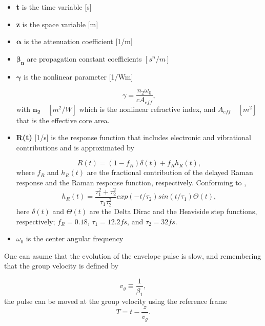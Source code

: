     \begin{itemize}
        \item \textbf{t} is the time variable [s]
        \item \textbf{z} is the space variable [m]
        \item $\mathbf{\alpha}$ is the attenuation coefficient [1/m]
        \item $\mathbf{\beta_n}$ are propagation constant coefficients $[s^n/m]$
        \item $\mathbf{\gamma}$ is the nonlinear parameter [1/Wm]
        
            \begin{equation}
                \gamma = \frac{n_2 \omega_0}{c A_{eff}},
                \label{eq_gamma}
            \end{equation}
        with $\mathbf{n_2} \quad [m^2/W]$ which is the nonlinear refractive index, and $A_{eff} \quad [m^2]$ that  is the  effective core area.
        \item \textbf{R(t)} [1/s] is the response function that includes electronic and vibrational contributions and is approximated by 
        
        \begin{equation}\label{eq_rt}
            R(t) = (1- f_R)\delta(t) + f_R h_R(t),
        \end{equation}
        where $f_R$ and $h_R(t)$ are the fractional contribution of the delayed Raman response and the Raman response function, respectively. Conforming to \cite{dudley_taylor_2010}, 
        \begin{equation}\label{eq_hr}
            h_R(t) = \frac{\tau^2_1+\tau^2_2}{\tau_1\tau^2_2} exp(-t/\tau_2)sin(t/\tau_1)\Theta(t),
        \end{equation}
        here $\delta(t)$ and $\Theta(t)$ are the Delta Dirac and the Heaviside step functions, respectively; $f_R = 0.18$,  $\tau_1 =12.2 fs$, and $\tau_2 = 32 fs$.
         
         
        \item $\omega_0$  is the center angular frequency
    
    \end{itemize}
   
    One can asume that the evolution of the envelope pulse is slow, and remembering that the group velocity is defined by 
    
    \begin{equation}\label{eq_vg}
        v_g \equiv \frac{1}{\beta_1}, 
    \end{equation}
    the pulse can be moved at the group velocity using the reference frame 
    \begin{equation}\label{eq_t}
        T = t - \frac{z}{v_g}. 
    \end{equation}
    
